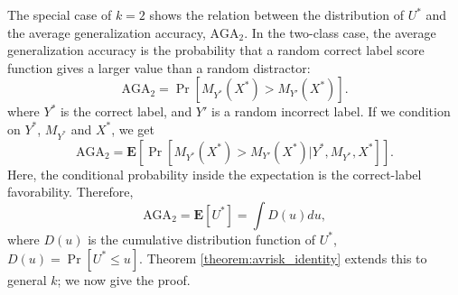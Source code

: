 \documentclass[twoside,11pt]{article}
\newcommand{\E}{\textbf{E}}
\begin{document}
The special case of $k=2$ shows the relation between the distribution
of $U^*$ and the average generalization accuracy, $\text{AGA}_2$. In
the two-class case, the average generalization accuracy is the
probability that a random correct label score function gives a larger
value than a random distractor:
\[
\text{AGA}_2 = \Pr[M_{Y^*}(X^*) > M_{Y'}(X^*)].
\]
where $Y^*$ is the correct label, and $Y'$ is a random incorrect
label.  If we condition on $Y^*$, $M_{Y^*}$ and $X^*$, we get
\[
\text{AGA}_2 = \E[\Pr[M_{Y^*}(X^*) > M_{Y'}(X^*)|Y^*, M_{Y^*}, X^*]].
\]
Here, the conditional probability inside the expectation is the
correct-label favorability.  Therefore,
\[
\text{AGA}_2 = \E[U^*] = \int {D}(u) du,
\]
where ${D}(u)$ is the cumulative distribution function of $U^*$,
${D}(u) = \Pr[U^* \leq u]$.  Theorem \ref{theorem:avrisk_identity}
extends this to general $k$; we now give the proof.\newline


\end{document}

